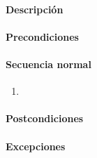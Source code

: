 \paragraph{Descripción}
\paragraph{Precondiciones}
\paragraph{Secuencia normal}
\begin{enumerate}
\item 
\end{enumerate}
\paragraph{Postcondiciones}
\paragraph{Excepciones}
